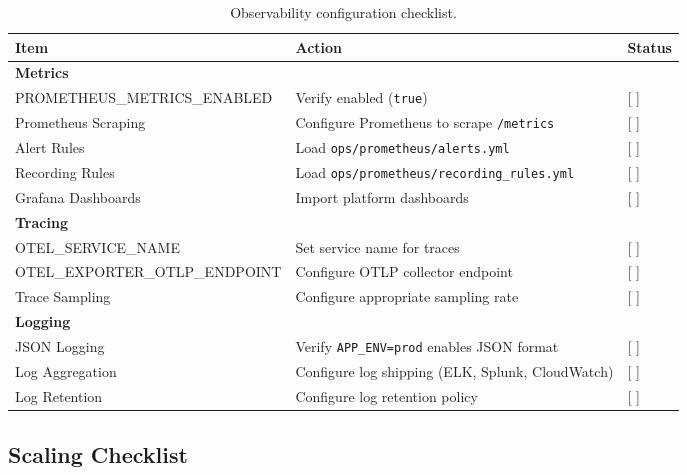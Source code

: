 \begin{table}[ht]
\centering
\caption{Observability configuration checklist.}
\label{tab:observability-checklist}
\small
\begin{tabularx}{\textwidth}{lXl}
\hline
\textbf{Item} & \textbf{Action} & \textbf{Status} \\
\hline
\multicolumn{3}{l}{\textbf{Metrics}} \\
PROMETHEUS\_METRICS\_ENABLED & Verify enabled (\texttt{true}) & [ ] \\
Prometheus Scraping & Configure Prometheus to scrape \texttt{/metrics} & [ ] \\
Alert Rules & Load \texttt{ops/prometheus/alerts.yml} & [ ] \\
Recording Rules & Load \texttt{ops/prometheus/recording\_rules.yml} & [ ] \\
Grafana Dashboards & Import platform dashboards & [ ] \\
\hline
\multicolumn{3}{l}{\textbf{Tracing}} \\
OTEL\_SERVICE\_NAME & Set service name for traces & [ ] \\
OTEL\_EXPORTER\_OTLP\_ENDPOINT & Configure OTLP collector endpoint & [ ] \\
Trace Sampling & Configure appropriate sampling rate & [ ] \\
\hline
\multicolumn{3}{l}{\textbf{Logging}} \\
JSON Logging & Verify \texttt{APP\_ENV=prod} enables JSON format & [ ] \\
Log Aggregation & Configure log shipping (ELK, Splunk, CloudWatch) & [ ] \\
Log Retention & Configure log retention policy & [ ] \\
\hline
\end{tabularx}
\end{table}

\subsection{Scaling Checklist}

